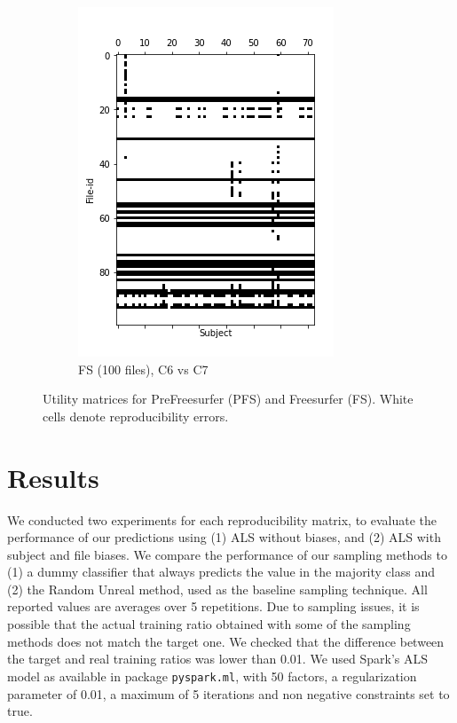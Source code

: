 \documentclass[10pt, conference, compsocconf]{IEEEtran}
\begin{document}
\begin{figure}[h!]
\begin{subfigure}[b]{0.45\columnwidth}
        \includegraphics[width=\columnwidth]{data/Utility_Matrix/FS-100files/FS-First-bound-100files.png}
  \caption{FS (100 files), C6 vs C7}
  \end{subfigure}
  \caption{Utility matrices for PreFreesurfer (PFS) and Freesurfer (FS). White cells denote reproducibility errors.}
    \label{fig:utility-matrices}
\end{figure}

\section{Results}

\label{sec:results}

We conducted two experiments for each reproducibility matrix, to evaluate the performance of our 
predictions using (1) ALS without biases, and (2) ALS with subject and file biases. We 
compare the performance of our sampling methods to (1) a dummy 
classifier that always predicts the value in the majority class and (2) 
the Random Unreal method, used as the baseline sampling technique. All 
reported values are averages over 5 repetitions. Due to sampling 
issues, it is possible that the actual training ratio obtained with 
some of the sampling methods does not 
match the target one. We checked that the difference between the target 
and real training ratios was lower than 0.01. We used Spark's ALS model 
as available in package \texttt{pyspark.ml}, with 50 factors, a 
regularization parameter of 0.01, a maximum of 5 iterations and non 
negative constraints set to true.
\end{document}
